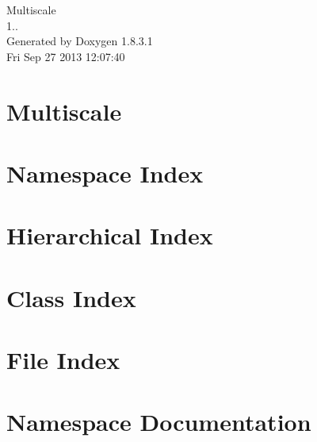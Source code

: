 \documentclass{book}
\begin{document}
\hypersetup{pageanchor=false,citecolor=blue}
\begin{titlepage}
\vspace*{7cm}
\begin{center}
{\Large Multiscale \\[1ex]\large 1.. }\\
\vspace*{1cm}
{\large Generated by Doxygen 1.8.3.1}\\
\vspace*{0.5cm}
{\small Fri Sep 27 2013 12:07:40}\\
\end{center}
\end{titlepage}
\clearemptydoublepage
{}
\tableofcontents
\clearemptydoublepage
{}
\hypersetup{pageanchor=true,citecolor=blue}
\chapter{Multiscale}
\label{index}\hypertarget{index}{}
\chapter{Namespace Index}

\chapter{Hierarchical Index}

\chapter{Class Index}

\chapter{File Index}

\chapter{Namespace Documentation}



\end{document}
